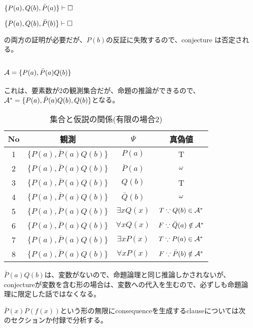 \documentclass[10pt, oneside]{jarticle}   	%
\begin{document}
$\{P(a), Q(b), \bar P(a)\} \vdash \Box$

$\{P(a), Q(b), \bar P(b)\} \vdash \Box$

の両方の証明が必要だが、$P(b)$の反証に失敗するので、conjecture は否定される。


\subsection{$\mathcal{A}=\{{P(a), \bar P(a)Q(b)}\}$}

これは、要素数が2の観測集合だが、命題の推論ができるので、$\mathcal{A}^{*}=\{{P(a), \bar P(a)Q(b), Q(b)}\}$となる。

\begin{table}[htbp]
 \centering
 \begin{tabular}{|c|c|c|c|}\hline
   No & 観測 & $\Psi$ & 真偽値 \\ \hline
   1 & $\{P(a), \bar{P}(a)Q(b)\}$ & $P(a)$ & T \\ \hline
   2 & $\{P(a), \bar P(a)Q(b)\}$ & $\bar P(a)$ & $\omega$ \\ \hline %
   3 & $\{P(a), \bar P(a)Q(b)\}$ & $Q(b)$ & T \\ \hline
   4 & $\{P(a), \bar P(a)Q(b)\}$ & $\bar Q(b)$ & $\omega$ \\ \hline  %
   5 & $\{P(a), \bar P(a)Q(b)\}$ & $\exists x Q(x)$ & $T \because Q(b) \in \mathcal{A}^{*}$ \\ \hline
   6 & $\{P(a), \bar P(a)Q(b)\}$ & $\forall x Q(x)$ & $F \because  \bar Q(a) \notin \mathcal{A}^{*}$ \\ \hline
   7 & $\{P(a), \bar P(a)Q(b)\}$ & $\exists x P(x)$ & $T \because P(a) \in \mathcal{A}^{*}$ \\ \hline
   8 & $\{P(a), \bar P(a)Q(b)\}$ & $\forall x P(x)$ & $F \because \bar P(b) \notin \mathcal{A}^{*}$ \\ \hline
 \end{tabular}
 \caption{集合と仮説の関係(有限の場合2)}
 \label{tab:ex0104}
\end{table}


$\bar P(a) Q(b)$は、変数がないので、命題論理と同じ推論しかされないが、conjectureが変数を含む形の場合は、変数への代入を生むので、必ずしも命題論理に限定した話ではなくなる。

$\bar P(x) P(f(x))$という形の無限にconsequenceを生成するclauseについては次のセクションか付録で分析する。
\end{document}
